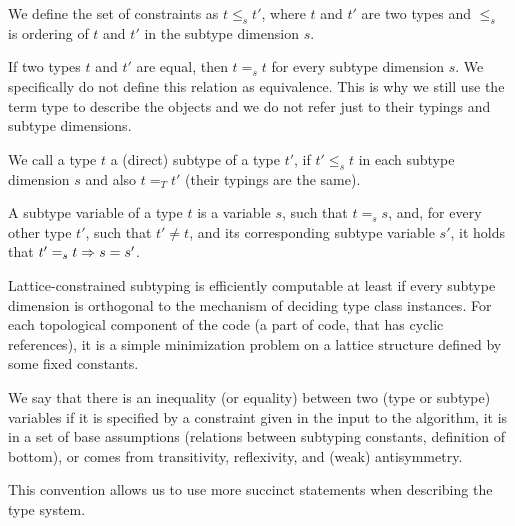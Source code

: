 \begin{defn}
    We define the set of constraints as $t \leq_s t'$, where $t$ and $t'$ are two types and $\leq_s$ is ordering of $t$ and $t'$ in the subtype dimension $s$.
\end{defn}

\begin{defn}
    If two types $t$ and $t'$ are equal, then $t =_s t$ for every subtype dimension $s$. We specifically do not define this relation as equivalence. This is why we still use the term type to describe the objects and we do not refer just to their typings and subtype dimensions.
\end{defn}

\begin{defn}
    We call a type $t$ a (direct) subtype of a type $t'$, if $t' \leq_s t$ in each subtype dimension $s$ and also $t =_T t'$ (their typings are the same).
\end{defn}

\begin{defn}
    A subtype variable of a type $t$ is a variable $s$, such that $t =_s s$, and, for every other type $t'$, such that $t' \neq t$, and its corresponding subtype variable $s'$, it holds that $t' =_s t \Rightarrow s = s'$.
\end{defn}

Lattice-constrained subtyping is efficiently computable at least if every subtype dimension is orthogonal to the mechanism of deciding type class instances. For each topological component of the code (a part of code, that has cyclic references), it is a simple minimization problem on a lattice structure defined by some fixed constants.

\begin{remark}
    We say that there is an inequality (or equality) between two (type or subtype) variables if it is specified by a constraint given in the input to the algorithm, it is in a set of base assumptions (relations between subtyping constants, definition of bottom), or comes from transitivity, reflexivity, and (weak) antisymmetry.

    This convention allows us to use more succinct statements when describing the type system.
\end{remark}

